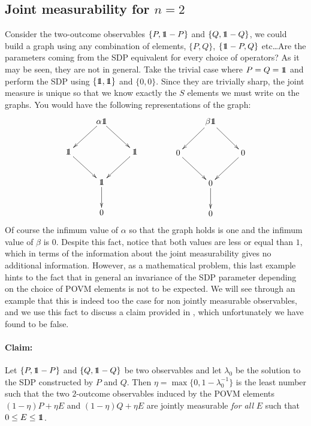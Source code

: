 \documentclass[10pt, a4paper]{amsart}
\begin{document}
\subsection{Joint measurability for $n=2$}
\label{subsection:JMforN2}
Consider the two-outcome observables $\{P, \bbone - P\}$ and $\{Q, \bbone - Q\}$, we could build a graph using any combination of elements, $\{P,Q\}$, $\{\bbone - P, Q\}$ etc\ldots Are the parameters coming from the SDP equivalent for every choice of operators? As it may be seen, they are not in general. Take the trivial case where $P =Q = \bbone$ and perform the SDP using $\{\bbone, \bbone\}$ and $\{0,0\}$. Since they are trivially sharp, the joint measure is unique so that we know exactly the $S$ elements we must write on the graphs.  You would have the following representations of the graph:
$$
\xymatrix{
&\alpha\bbone\ar[dl]\ar[dr] &\\
\bbone\ar[dr] && \bbone\ar[dl]\\
&\bbone \ar[d]&\\
&0 &
}
\qquad \qquad
\xymatrix{
&\beta\bbone\ar[dl]\ar[dr] &\\
0\ar[dr] && 0\ar[dl]\\
&0\ar[d]&\\
&0&
}
$$
Of course the infimum value of $\alpha$ so that the graph holds is one and the infimum value of $\beta$ is 0. Despite this fact, notice that both values are less or equal than $1$, which in terms of the information about the joint measurability gives no additional information.
However, as a mathematical problem, this last example hints to the fact that in general an invariance of the SDP parameter depending on the choice of POVM elements is not to be expected. 
We will see through an example that this is indeed too the case for non jointly measurable observables, and we use this fact to discuss a claim provided in \cite{wolfgarcia}, which unfortunately we have found to be false. \\

\paragraph{\bf Claim:}\!\!\cite{wolfgarcia} Let $\{P , \bbone - P\}$ and $\{Q, \bbone - Q\}$ be two observables and let $\lambda_{0}$ be the solution to the SDP constructed by $P$ and $Q$. Then $\eta = \max\{0 , 1-\lambda_{0}^{-1}\}$ is the least number such that 
the two $2$-outcome observables induced by the POVM elements $(1-\eta) P + \eta E$ and $(1-\eta) Q + \eta E$ are jointly measurable \textit{for all} $E$ such that $0\leq E\leq \bbone$. \\
\end{document}
